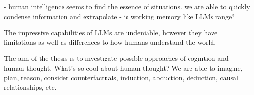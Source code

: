 - human intelligence seems to find the essence of situations. we are able to quickly condense information and extrapolate 
- is working memory like LLMs range?


The impressive capabilities of LLMs are undeniable, however they have limitations as well as differences to how humans understand the world. 


The aim of the thesis is to investigate possible approaches of cognition and human thought. 
What's so cool about human thought?
We are able to imagine, plan, reason, consider counterfactuals, induction, abduction, deduction, causal relationships,  etc. 
